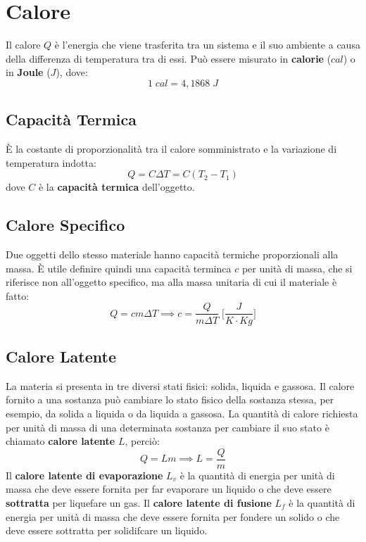     \section{Calore} Il calore $Q$ è l'energia che viene trasferita tra un 
    sistema e il suo ambiente a causa della differenza di temperatura tra di 
    essi. Può essere misurato in \textbf{calorie} ($cal$) o in \textbf{Joule}
    ($J$), dove:
        \begin{equation*}
            1 \; cal = 4,1868 \; J
        \end{equation*}

        \subsection{Capacità Termica} È la costante di proporzionalità tra il 
        calore somministrato e la variazione di temperatura indotta:
            \begin{equation}
                Q = C \Delta T = C (T_2 - T_1)
            \end{equation}
        dove $C$ è la \textbf{capacità termica} dell'oggetto.

        \subsection{Calore Specifico} Due oggetti dello stesso materiale hanno 
        capacità termiche proporzionali alla massa. È utile definire quindi una 
        capacità terminca $c$ per unità di massa, che si riferisce non 
        all'oggetto specifico, ma alla massa unitaria di cui il materiale è 
        fatto:
            \begin{equation}
                Q = cm \Delta T
                \implies
                c = \frac{Q}{m \Delta T}
             \; \Bigg[\frac{J}{K \cdot Kg}\Bigg]
            \end{equation}

        \subsection{Calore Latente} La materia si presenta in tre diversi stati
        fisici: solida, liquida e gassosa. Il calore fornito a una sostanza può
        cambiare lo stato fisico della sostanza stessa, per esempio, da solida 
        a liquida o da liquida a gassosa. La quantità di calore richiesta per 
        unità di massa di una determinata sostanza per cambiare il suo stato
        è chiamato \textbf{calore 
        latente} $L$, perciò:
            \begin{equation}
                Q = Lm \implies L = \frac{Q}{m}
            \end{equation}
        Il \textbf{calore latente di evaporazione} $L_v$ è la quantità di 
        energia per unità di massa che deve essere fornita per far evaporare un
        liquido o che deve essere \textbf{sottratta} per liquefare un gas. Il 
        \textbf{calore latente di fusione} $L_f$ è la quantità di energia per 
        unità di massa che deve essere fornita per fondere un solido o che deve
        essere sottratta per solidifcare un liquido.
        
